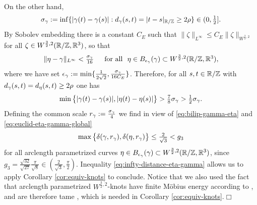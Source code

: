 On the other hand,
$$
\textstyle
\sigma_\gamma:=
\inf\{|\gamma(t)-\gamma(s)|:d_\gamma(s,t)=|t-s|_{\mathbb{R}/\mathbb{Z}}\ge 2\rho\}\in (0,\frac12].
$$
By Sobolev embedding there is a constant $C_E$ such that $\|\zeta\|_{L^\infty}
\le C_E\|\zeta\|_{W^{\frac32,2}}$ for all $\zeta\in W^{\frac32,2}(\mathbb{R}/\mathbb{Z},\mathbb{R}^3)$,
so that
\begin{equation}\label{eq:infty-distance-eta-gamma}
\textstyle
\|\eta-\gamma\|_{L^\infty}< \frac{\sigma_\gamma}{16}\quad\,\,\,\text{for all }\,\,\eta\in B_{\epsilon_\gamma}(\gamma)
\subset W^{\frac32,2}(\mathbb{R}/\mathbb{Z},\mathbb{R}^3),
\end{equation}
where we have set $\epsilon_\gamma:=\min\{\frac1{2\sqrt{2}},\frac{\sigma_\gamma}{16C_E}\}$.
Therefore, for all $s,t\in\mathbb{R}/\mathbb{Z}$ with $d_\gamma(s,t)=d_\eta(s,t)
\ge 2\rho$ one has
\begin{equation}\label{eq:euclid-eta-gamma-global}
\textstyle
\min\big\{|\gamma(t)-\gamma(s)|,|\eta(t)-\eta(s)|\big\}>\frac{7}{8}\sigma_\gamma
>\frac{1}{2}\sigma_\gamma.
\end{equation}
Defining the common scale $r_{\gamma}:=\frac{\sigma_\gamma}4$ we find in view of 
\eqref{eq:bilip-gamma-eta} and \eqref{eq:euclid-eta-gamma-global}
\begin{equation}\label{eq:max-eta-gamma-distortion}
\textstyle
\max\big\{\delta(\gamma,r_\gamma),\delta(\eta,r_\gamma)\big\}\le\frac{2}{\sqrt{3}}<g_3
\end{equation}
for all arclength parametrized curves $\eta\in B_{\epsilon_\gamma}(\gamma)\subset
W^{\frac32,2}(\mathbb{R}/\mathbb{Z},\mathbb{R}^3)$, since 
$g_3=\frac{\sqrt{32}}{\sqrt{27}}\frac{\pi}{\sqrt{8}}\in 
(\frac2{\sqrt{3}},\frac{\pi}2)$.
Inequality \eqref{eq:infty-distance-eta-gamma} allows us to apply
Corollary \ref{cor:equiv-knots} to conclude. Notice that we also used
the fact that arclength parametrized $W^{\frac32,2}$-knots have finite
M\"obius energy according to \cite[Theorem~1.1]{blatt_2012a}, and
are therefore tame \cite[Theorem~4.1]{freedman-etal_1994}, which is needed
in Corollary \ref{cor:equiv-knots}.\hfill $\Box$
